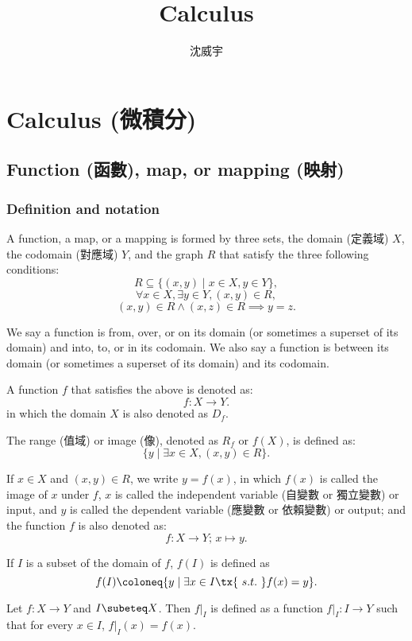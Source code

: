 \documentclass[a4paper,12pt]{report}
\begin{document}
\title{Calculus}
\author{沈威宇}
\date{\temtoday}
\titletocdoc
\chapter{Calculus (微積分)}
\section{Function (函數), map, or mapping (映射)}
\subsection{Definition and notation}
A function, a map, or a mapping is formed by three sets, the domain (定義域) $X$, the codomain (對應域) $Y$, and the graph $R$ that satisfy the three following conditions:
\[R\subseteq \{(x,y)\mid x\in X,y\in Y\},\]
\[\forall x\in X,\exists y\in Y,\left(x,y\right)\in R ,\]
\[ (x,y)\in R\land (x,z)\in R\implies y=z.\]

We say a function is from, over, or on its domain (or sometimes a superset of its domain) and into, to, or in its codomain. We also say a function is between its domain (or sometimes a superset of its domain) and its codomain.

A function $f$ that satisfies the above is denoted as:
\[f\colon X\to Y.\]
in which the domain $X$ is also denoted as $D_f$.

The range (值域) or image (像), denoted as $R_f$ or $f(X)$, is defined as:
\[\{ y \mid \exists x \in X, (x, y) \in R \}.\]

If $x\in X$ and $(x, y) \in R$, we write $y = f(x)$, in which $f(x)$ is called the image of $x$ under $f$, $x$ is called the independent variable (自變數 or 獨立變數) or input, and $y$ is called the dependent variable (應變數 or 依賴變數) or output; and the function $f$ is also denoted as:
\[f \colon X \to Y;\, x \mapsto y.\]

If $I$ is a subset of the domain of $f$, $f(I)$ is defined as
\[f(I)\coloneq\{y\mid\exists x\in I \tx{\ s.t.\ }f(x)=y\}.\]

Let $f\colon X\to Y$ and $I\subeteq X$. Then $f\vert_I$ is defined as a function $f\vert_I\colon I\to Y$ such that for every $x\in I$, $f\vert_I(x)=f(x)$.
\end{document}
